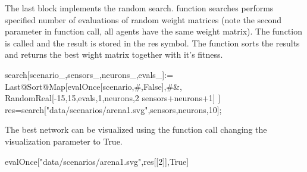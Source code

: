 The last block implements the random search.  function searches performs specified number of evaluations of random weight matrices (note the second parameter in  function call, all agents have the same weight matrix). The function is called and the result is stored in the res symbol. The function sorts the results and returns the best wight matrix together with it's fitness.

\begin{colorverbatim}
search[scenario_,sensors_,neurons_,evals_]:=
    Last@Sort@Map[{evalOnce[scenario,#,False],#}&,
        RandomReal[{-15,15},{evals,1,neurons,2 sensors+neurons+1}]
                 ]
res=search["data/scenarios/arena1.svg",sensors,neurons,10];
\end{colorverbatim}

The best network can be visualized using the  function call changing the visualization parameter to True.
\begin{colorverbatim}
evalOnce["data/scenarios/arena1.svg",res[[2]],True]
\end{colorverbatim}


